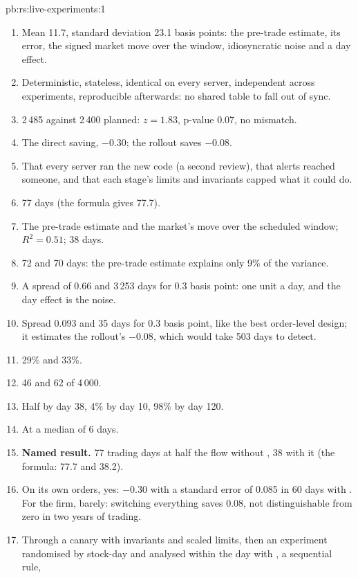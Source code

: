 \begin{solution}{pb:rs:live-experiments:1}
\begin{enumerate}
\item Mean 11.7, standard deviation 23.1 basis points: the pre-trade estimate, its error, the signed market move over the window, idiosyncratic noise and a
day effect.
\item Deterministic, stateless, identical on every server, independent across experiments, reproducible afterwards: no shared table to fall out of sync.
\item 2\,485 against 2\,400 planned: $z = 1.83$, p-value 0.07, no mismatch.
\item The direct saving, $-0.30$; the rollout saves $-0.08$.
\item That every server ran the new code (a second review), that alerts reached someone, and that each stage's limits and invariants capped what it could do.
\item 77 days (the formula gives 77.7).
\item The pre-trade estimate and the market's move over the scheduled window; $R^2 = 0.51$; 38 days.
\item 72 and 70 days: the pre-trade estimate explains only 9\% of the variance.
\item A spread of 0.66 and 3\,253 days for 0.3 basis point: one unit a day, and the day effect is the noise.
\item Spread 0.093 and 35 days for 0.3 basis point, like the best order-level design; it estimates the rollout's $-0.08$, which would take 503 days to detect.
\item 29\% and 33\%.
\item 46 and 62 of 4\,000.
\item Half by day 38, 4\% by day 10, 98\% by day 120.
\item At a median of 6 days.
\item \textbf{Named result.} 77 trading days at half the flow without , 38 with it (the formula: 77.7 and 38.2).
\item On its own orders, yes: $-0.30$ with a standard error of 0.085 in 60 days with . For the firm, barely: switching everything saves 0.08, not
distinguishable from zero in two years of trading.
\item Through a canary with invariants and scaled limits, then an experiment randomised by stock-day and analysed within the day with , a sequential rule,

\end{enumerate}
\end{solution}
